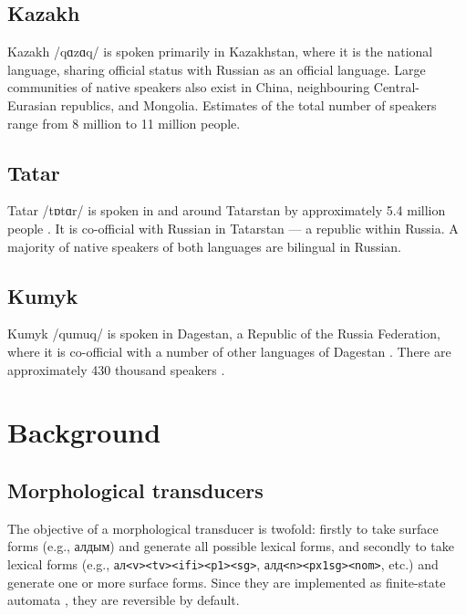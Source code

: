 \documentclass[a4paper,11pt,twocolumn]{article}
\begin{document}
\subsection{Kazakh}
Kazakh /q{\symbl ɑ}z{\symbl ɑ}q/ is spoken primarily in Kazakhstan, where it is the national language, sharing official status with Russian as an official language.  Large communities of native speakers also exist in China, neighbouring Central-Eurasian republics, and Mongolia.  Estimates of the total number of speakers range from 8 million \citep{ethnologue} to 11 million \citep{encyclopedin} people.

\subsection{Tatar}
Tatar /t{\symbl ɒ}t{\symbl ɑ}r/ is spoken in and around Tatarstan by approximately 5.4 million people \citep{ethnologue}.  It is co-official with Russian in Tatarstan --- a republic within Russia.  A majority of native speakers of both languages are bilingual in Russian. %

\subsection{Kumyk}
Kumyk /qumuq/ is spoken in Dagestan, a Republic of the Russia Federation, where it is co-official with a number of other languages of Dagestan \citep{ethnologue}.  There are approximately 430 thousand speakers \citep{ethnologue}.

\cite{bammatov1960}
\cite{olmesov2000}

\section{Background}
\subsection{Morphological transducers}
The objective of a morphological transducer is twofold: firstly to take surface forms (e.g., алдым) and generate all possible lexical forms, and secondly to take lexical forms (e.g.,  ал{\tt {\small <v><tv><ifi><p1><sg>}}, алд{\tt {\small <n><px1sg><nom>}}, etc.) and generate one or more surface forms.  Since they are implemented as finite-state automata \citet{FSTs}, they are reversible by default.
\end{document}
